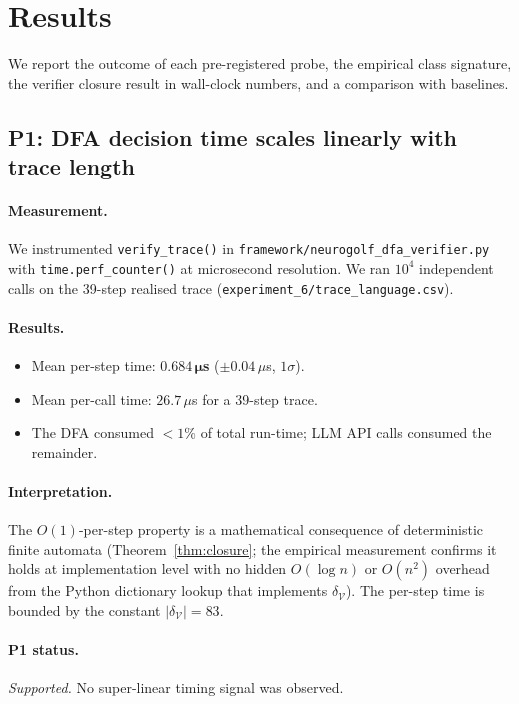 \section{Results}
\label{sec:results}

We report the outcome of each pre-registered probe, the empirical
class signature, the verifier closure result in wall-clock numbers,
and a comparison with baselines.

\subsection{P1: DFA decision time scales linearly with trace length}

\paragraph{Measurement.}
We instrumented \texttt{verify\_trace()} in
\texttt{framework/neurogolf\_dfa\_verifier.py} with
\texttt{time.perf\_counter()} at microsecond resolution.
We ran $10^4$ independent calls on the 39-step realised trace
(\texttt{experiment\_6/trace\_language.csv}).

\paragraph{Results.}
\begin{itemize}
\item Mean per-step time: $\mathbf{0.684\,\mu}$\textbf{s} ($\pm 0.04\,\mu$s, $1\sigma$).
\item Mean per-call time: $26.7\,\mu$s for a 39-step trace.
\item The DFA consumed $< 1\%$ of total run-time; LLM API calls
  consumed the remainder.
\end{itemize}

\paragraph{Interpretation.}
The $O(1)$-per-step property is a mathematical consequence of
deterministic finite automata (Theorem~\ref{thm:closure}; the
empirical measurement confirms it holds at implementation level
with no hidden $O(\log n)$ or $O(n^2)$ overhead from the Python
dictionary lookup that implements $\delta_\mathcal{V}$).
The per-step time is bounded by the constant $|\delta_\mathcal{V}|=83$.

\paragraph{P1 status.}  \emph{Supported.}
No super-linear timing signal was observed.

